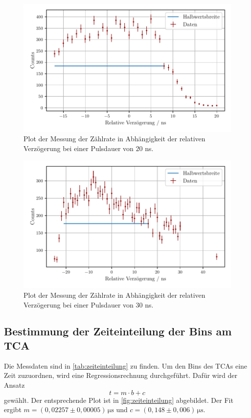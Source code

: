 \begin{figure}
    \centering
    \includegraphics[width = 0.7 \linewidth]{build/20ns_plot.pdf}
    \caption{Plot der Messung der Zählrate in Abhängigkeit der relativen Verzögerung bei einer Pulsdauer von $20$ ns.}
    \label{fig:20ns_plot}
\end{figure}

\begin{figure}
    \centering
    \includegraphics[width = 0.7 \linewidth]{build/30ns_plot.pdf}
    \caption{Plot der Messung der Zählrate in Abhängigkeit der relativen Verzögerung bei einer Pulsdauer von $30$ ns.}
    \label{fig:30ns_plot}
\end{figure}

\subsection{Bestimmung der Zeiteinteilung der Bins am TCA} \label{sec:zeiteinteilung}

Die Messdaten sind in \autoref{tab:zeiteinteilung} zu finden.
Um den Bins des TCAs eine Zeit zuzuordnen, wird eine Regressionsrechnung durchgeführt.
Dafür wird der Ansatz
\begin{equation*}
    t = m \cdot b + c
\end{equation*}
gewählt.
Der entsprechende Plot ist in \autoref{fig:zeiteinteilung} abgebildet.
Der Fit ergibt 
$m = (0{,}02257 \pm 0{,}00005) \, \unit{\micro\second}$ und $c = (0{,}148 \pm 0{,}006) \, \unit{\micro\second}$.


